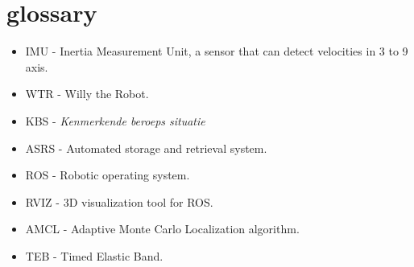 \section{glossary}
\begin{itemize}
\item \label{trm::imu} IMU - Inertia Measurement Unit, a sensor that can detect velocities in 3 to 9 axis.
\item \label{trm::wtr} WTR - Willy the Robot.
\item \label{trm::kbs} KBS - \textit{Kenmerkende beroeps situatie}
\item \label{trm::asrs} ASRS - Automated storage and retrieval system.
\item \label{trm::ros} ROS - Robotic operating system.
\item \label{trm::rviz} RVIZ - 3D visualization tool for ROS.
\item \label{trm::amcl} AMCL - Adaptive Monte Carlo Localization algorithm.
\item \label{trm::teb} TEB - Timed Elastic Band.
\end{itemize}